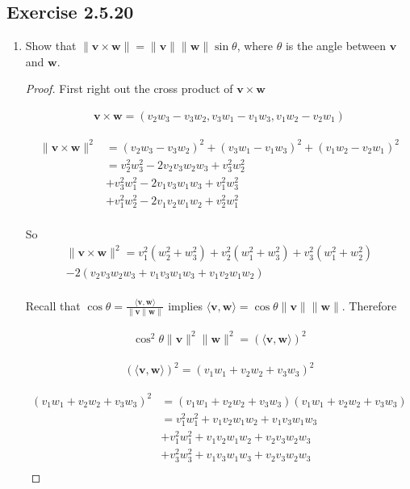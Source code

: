 \documentclass{tufte-book}
\newcommand{\vct}{\mathbf}
\newcommand{\dprod}[2]{\langle #1, #2 \rangle}
\theoremstyle{mytheoremstyle}
\theoremstyle{mylemstyle}
\theoremstyle{mydefstyle}
\begin{document}
\subsection{Exercise 2.5.20}
\begin{enumerate}
\item Show that $\|\vct{v} \times \vct{w} \| = \|\vct{v}\|\|\vct{w}\|\sin \theta$, where $\theta$ is the angle between $\vct{v}$ and $\vct{w}$.

\begin{proof}

First right out the cross product of $\vct{v} \times \vct{w}$

\begin{align}
\vct{v} \times \vct{w} = (v_2w_3 - v_3w_2, v_3w_1 - v_1w_3, v_1w_2 - v_2w_1)
\end{align}

\begin{align*}
\|\vct{v} \times \vct{w} \|^2 &= (v_2w_3 - v_3w_2)^2+(v_3w_1 - v_1w_3)^2+(v_1w_2 - v_2w_1)^2\\
&=v_2^2w_3^2 - 2v_2v_3w_2w_3 + v_3^2w_2^2 \\
&+ v_3^2w_1^2 - 2v_1v_3w_1w_3 + v_1^2w_3^2 \\
&+ v_1^2w_2^2 - 2v_1v_2w_1w_2 + v_2^2w_1^2 \\
\end{align*}

So
\begin{multline}
\|\vct{v} \times \vct{w} \|^2 = v_1^2(w_2^2 + w_3^2) + v_2^2(w_1^2+w_3^2) + v_3^2(w_1^2+w_2^2)\\ 
-2(v_2v_3w_2w_3 + v_1v_3w_1w_3 + v_1v_2w_1w_2)\\
\end{multline}

Recall that $\cos \theta = \frac{\dprod{\vct{v}}{\vct{w}}}{\|\vct{v}\|\vct{w}\|}$ implies $\dprod{\vct{v}}{\vct{w}} = \cos\theta \|\vct{v}\|\|\vct{w}\|$.  Therefore

\begin{align}
\cos^2\theta \|\vct{v}\|^2\|\vct{w}\|^2 = (\dprod{\vct{v}}{\vct{w}})^2
\end{align}

\begin{align}
(\dprod{\vct{v}}{\vct{w}})^2 = (v_1w_1 + v_2w_2 + v_3w_3)^2
\end{align}

\begin{align*}
(v_1w_1 + v_2w_2 + v_3w_3)^2 &= (v_1w_1 + v_2w_2 + v_3w_3)(v_1w_1 + v_2w_2 + v_3w_3)\\
&= v_1^2w_1^2 + v_1v_2w_1w_2 + v_1v_3w_1w_3 \\
&+ v_1^2w_1^2 + v_1v_2w_1w_2 + v_2v_3w_2w_3 \\
&+ v_3^2w_3^2 + v_1v_3w_1w_3 + v_2v_3w_2w_3 \\
\end{align*}


\end{proof}
\end{enumerate}
\end{document}

